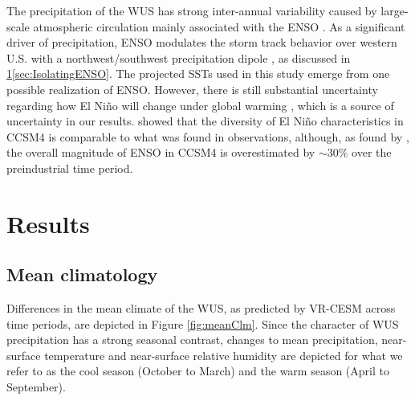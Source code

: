 The precipitation of the WUS has strong inter-annual variability caused by large-scale atmospheric circulation mainly associated with the ENSO \cite{leung2003hydroclimate}. As a significant driver of precipitation, ENSO modulates the storm track behavior over western U.S. with a northwest/southwest precipitation dipole \cite{gershunov1998interdecadal}, as discussed in \ref{sec:Results}\ref{sec:IsolatingENSO}. The projected SSTs used in this study emerge from one possible realization of ENSO. However, there is still substantial uncertainty regarding how El Ni\~no will change under global warming \cite{fedorov2000nino, guilyardi2009understanding}, which is a source of uncertainty in our results. \cite{capotondi2013enso} showed that the diversity of El Ni\~no characteristics in CCSM4 is comparable to what was found in observations, although, as found by \cite{deser2012enso}, the overall magnitude of ENSO in CCSM4 is overestimated by $\sim$30$\%$ over the preindustrial time period.


\section{Results} \label{sec:Results}

\subsection{Mean climatology} \label{sec:ResultsMeanClimatology}

Differences in the mean climate of the WUS, as predicted by VR-CESM across time periods, are depicted in Figure \ref{fig:meanClm}. Since the character of WUS precipitation has a strong seasonal contrast, changes to mean precipitation, near-surface temperature and near-surface relative humidity are depicted for what we refer to as the cool season (October to March) and the warm season (April to September).

